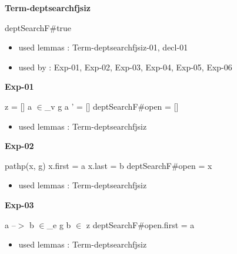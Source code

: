 \documentclass[a4paper]{article}
\begin{document}
\raggedright
              
\bigskip

{\large\bf Term-deptsearchfjsiz}

\medskip

 \Fol \Do deptSearchF\#\Dc true

\begin{itemize}


\item       used lemmas  : Term-deptsearchfjsiz-01, decl-01
\item       used by      : Exp-01, Exp-02, Exp-03, Exp-04, Exp-05, Exp-06

\end{itemize}

\medskip

\bigskip

{\large\bf Exp-01}

\medskip

 \Fol z = [] \And a $\in$\_v g \Or a ' = [] \Imp \Do deptSearchF\#\Dc open = []

\begin{itemize}


\item       used lemmas  : Term-deptsearchfjsiz

\end{itemize}

\medskip

\bigskip

{\large\bf Exp-02}

\medskip

 \Fol pathp(x, g) \And x.first = a \And x.last = b \Imp \Do deptSearchF\#\Dc open = x

\begin{itemize}


\item       used lemmas  : Term-deptsearchfjsiz

\end{itemize}

\medskip

\bigskip

{\large\bf Exp-03}

\medskip

 \Fol a --$>$ b $\in$\_e g \And b $\in$ z \Imp \Do deptSearchF\#\Dc open.first = a

\begin{itemize}


\item       used lemmas  : Term-deptsearchfjsiz

\end{itemize}
\end{document}
